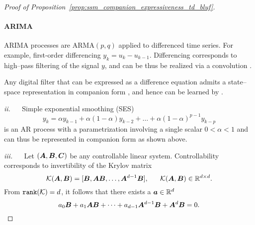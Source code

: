 \begin{proof}[Proof of Proposition~\ref{prop:ssm_companion_expressiveness_td_bluf}]
\paragraph{ARIMA} $\text{ARIMA}$ processes are $\text{ARMA}(p,q)$ applied to differenced time series. For example, first-order differencing $y_k = u_k - u_{k-1}$. Differencing corresponds to high--pass filtering of the signal $y$, and can be thus be realized via a convolution \citep{strang1996wavelets}. 

Any digital filter that can be expressed as a difference equation admits a state--space representation in companion form \citep{oppenheim1999discrete}, and hence can be learned by \ourmethod{}.


\textit{ii.} \fcircle[fill=red!30]{3pt}~~ Simple exponential smoothing (SES) \citep{brown1959statistical}
%
\begin{equation}\label{eq:ses}
    y_k = \alpha y_{k-1} + \alpha (1 - \alpha) y_{k-2} + \dots + \alpha(1 - \alpha)^{p-1} y_{k-p}
\end{equation}
is an AR process with a parametrization involving a single scalar $0 < \alpha < 1$ and can thus be represented in companion form as shown above. 




\textit{iii.} \fcircle[fill=blue!30]{3pt}~~ Let $(\boldsymbol{A}, \boldsymbol{B}, \boldsymbol{C})$ be any controllable linear system. Controllability corresponds to invertibility of the Krylov matrix \cite[Thm 6.1, p145]{chen1984linear}
\[
\mathcal{K}(\boldsymbol{A}, \boldsymbol{B}) = [\boldsymbol{B}, \boldsymbol{A} \boldsymbol{B}, \dots, \boldsymbol{A}^{d-1}\boldsymbol{B}],~~\quad \mathcal{K}(\boldsymbol{A}, \boldsymbol{B})\in\mathbb{R}^{d \times d}.
\]
%
From ${\tt rank}(\mathcal{K}) = d$, it follows that there exists a $\boldsymbol{a}\in\mathbb{R}^d$
\[
a_0 \boldsymbol{B} + a_1 \boldsymbol{A} \boldsymbol{B} + \dots + a_{d-1}\boldsymbol{A}^{d-1} \boldsymbol{B} + \boldsymbol{A}^d \boldsymbol{B} = 0.
\]


\end{proof}
